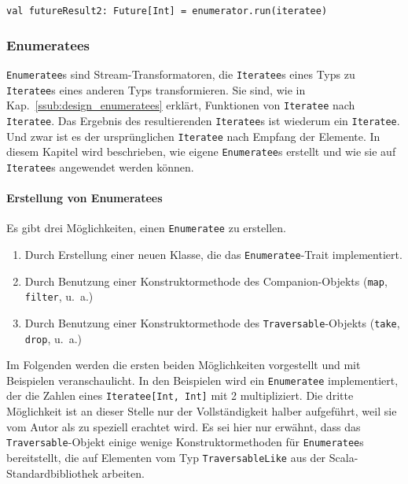 \documentclass[draft=false
              ,paper=a4
              ,twoside=false
              ,fontsize=11pt
              ,headsepline
              ,BCOR10mm
              ,DIV11
              ]{scrbook}
\begin{document}
\begin{lstlisting}[caption=Anwendung eines Enumerators mit gleichzeitiger Ergebnisextrahierung, label=lst:enumeratoranwendung3]
val futureResult2: Future[Int] = enumerator.run(iteratee)
\end{lstlisting}




\subsubsection{Enumeratees} %
\label{ssub:enumeratees}

\lstinline|Enumeratee|s sind Stream-Transformatoren, die \lstinline|Iteratee|s eines Typs zu \lstinline|Iteratee|s eines anderen Typs transformieren.
Sie sind, wie in Kap.~\ref{ssub:design_enumeratees} erklärt, Funktionen von \lstinline|Iteratee| nach \lstinline|Iteratee|.
Das Ergebnis des resultierenden \lstinline|Iteratee|s ist wiederum ein \lstinline|Iteratee|.
Und zwar ist es der ursprünglichen \lstinline|Iteratee| nach Empfang der Elemente.
In diesem Kapitel wird beschrieben, wie eigene \lstinline|Enumeratee|s erstellt und wie sie auf \lstinline|Iteratee|s angewendet werden können.

\paragraph{Erstellung von Enumeratees} %
\label{par:erstellung_von_enumeratees}\mbox{} %

Es gibt drei Möglichkeiten, einen \lstinline|Enumeratee| zu erstellen.

\begin{enumerate}
  \item Durch Erstellung einer neuen Klasse, die das \lstinline|Enumeratee|-Trait implementiert.
  \item Durch Benutzung einer Konstruktormethode des Companion-Objekts (\lstinline|map|, \lstinline|filter|, u.~a.)
  \item Durch Benutzung einer Konstruktormethode des \lstinline|Traversable|-Objekts (\lstinline|take|, \lstinline|drop|, u.~a.)
\end{enumerate}

Im Folgenden werden die ersten beiden Möglichkeiten vorgestellt und mit Beispielen veranschaulicht.
In den Beispielen wird ein \lstinline|Enumeratee| implementiert, der die Zahlen eines \lstinline|Iteratee[Int, Int]| mit 2 multipliziert.
Die dritte Möglichkeit ist an dieser Stelle nur der Vollständigkeit halber aufgeführt, weil sie vom Autor als zu speziell erachtet wird.
Es sei hier nur erwähnt, dass das \lstinline|Traversable|-Objekt einige wenige Konstruktormethoden für \lstinline|Enumeratee|s bereitstellt, die auf Elementen vom Typ \lstinline|TraversableLike| aus der Scala-Standardbibliothek arbeiten.
\end{document}
